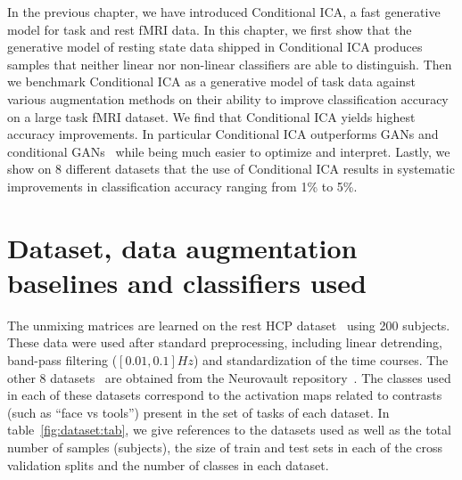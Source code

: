 In the previous chapter, we have introduced Conditional ICA, a fast generative
model for task and rest fMRI data.
In this chapter, we first show that the generative model of resting state data shipped in Conditional ICA produces samples that neither linear nor non-linear classifiers are able to distinguish.
% 
Then we benchmark Conditional ICA as a generative model of task data against
various augmentation methods  on their
ability to improve classification accuracy on a large task fMRI dataset.
We find that Conditional ICA yields highest accuracy improvements.
In particular Conditional ICA outperforms GANs and conditional GANs~\cite{mirza2014conditional} while being much easier to optimize and interpret. 
Lastly, we show on 8 different datasets that the use of Conditional ICA results in systematic improvements in classification accuracy ranging from 1\% to 5\%.

\section{Dataset, data augmentation baselines and classifiers used}
\label{sec:condica:datasets}
The unmixing matrices are learned on the rest HCP
dataset~\cite{van2013wu} using 200 subjects.
These data were used after standard
preprocessing, including linear detrending, band-pass filtering
($[0.01, 0.1]Hz$) and standardization of the time courses.
The other 8 datasets~\cite{van2013wu, shafto2014cambridge,
  orfanos2017brainomics, pinel2019functional, pinel2007fast, pinel2013genetic,
  poldrack2016phenome, pinel2013genetic} are obtained from the Neurovault repository~\cite{gorgolewski2015neurovault}.
The classes used in each of these datasets correspond to the activation maps
related to contrasts (such as ``face vs tools'')
present in the set of tasks of each dataset. In table~\ref{fig:dataset:tab}, we
give references to the datasets used as well as the total number of samples
(subjects), the size of train and test sets in each of the cross validation
splits and the number of classes in each dataset. 

